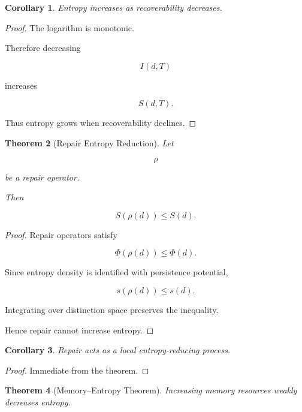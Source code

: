 \documentclass[12pt,oneside]{article}
\newtheorem{theorem}{Theorem}[section] \newtheorem{lemma}[theorem]{Lemma} \newtheorem{proposition}[theorem]{Proposition} \newtheorem{corollary}[theorem]{Corollary}
\theoremstyle{definition}
\begin{document}
\begin{corollary}

Entropy increases as recoverability decreases.

\end{corollary}

\begin{proof}

The logarithm is monotonic.

Therefore decreasing

\[
I(d,T)
\]

increases

\[
S(d,T).
\]

Thus entropy grows when recoverability declines.

\end{proof}

\begin{theorem}[Repair Entropy Reduction]

Let

\[
\rho
\]

be a repair operator.

Then

\[
S(\rho(d))
\le
S(d).
\]

\end{theorem}

\begin{proof}

Repair operators satisfy

\[
\Phi(\rho(d))
\le
\Phi(d).
\]

Since entropy density is identified with persistence potential,

\[
s(\rho(d))
\le
s(d).
\]

Integrating over distinction space preserves the inequality.

Hence repair cannot increase entropy.

\end{proof}

\begin{corollary}

Repair acts as a local entropy-reducing process.

\end{corollary}

\begin{proof}

Immediate from the theorem.

\end{proof}

\begin{theorem}[Memory–Entropy Theorem]

Increasing memory resources weakly decreases entropy.

\end{theorem}
\end{document}
